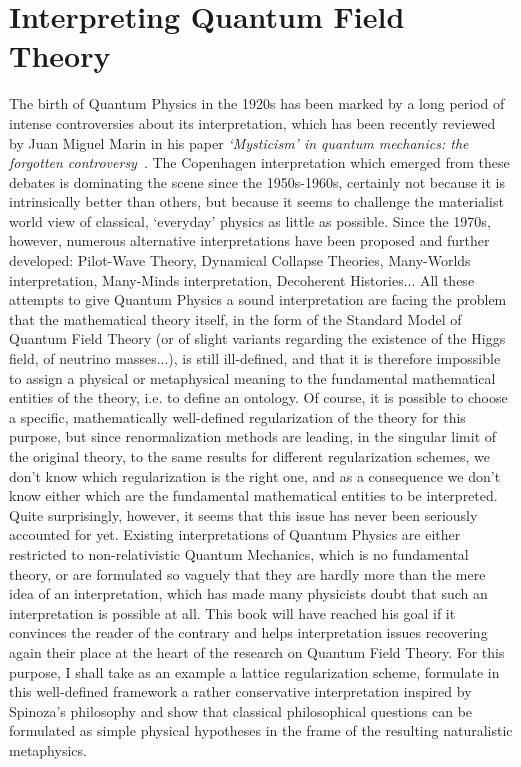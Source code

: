 \documentclass[10pt,a4paper,twoside,openany]{book}
\begin{document}
\section*{Interpreting Quantum Field Theory}

The birth of Quantum Physics in the 1920s has been marked by a long period of intense controversies about its interpretation, which has been recently reviewed by Juan Miguel Marin in his paper \textit{‘Mysticism’ in quantum mechanics: the forgotten controversy}~\cite{Marin2009}. The Copenhagen interpretation which emerged from these debates is dominating the scene since the 1950s-1960s, certainly not because it is intrinsically better than others, but because it seems to challenge the materialist world view of classical, `everyday' physics as little as possible. Since the 1970s, however, numerous alternative interpretations have been proposed and further developed: Pilot-Wave Theory, Dynamical Collapse Theories, Many-Worlds interpretation, Many-Minds interpretation, Decoherent Histories... All these attempts to give Quantum Physics a sound interpretation are facing the problem that the mathematical theory itself, in the form of the Standard Model of Quantum Field Theory (or of slight variants regarding the existence of the Higgs field, of neutrino masses...), is still ill-defined, and that it is therefore impossible to assign a physical or metaphysical meaning to the fundamental mathematical entities of the theory, i.e. to define an ontology. Of course, it is possible to choose a specific, mathematically well-defined regularization of the theory for this purpose, but since renormalization methods are leading, in the singular limit of the original theory, to the same results for different regularization schemes, we don't know which regularization is the right one, and as a consequence we don't know either which are the fundamental mathematical entities to be interpreted. Quite surprisingly, however, it seems that this issue has never been seriously accounted for yet. Existing interpretations of Quantum Physics are either restricted to non-relativistic Quantum Mechanics, which is no fundamental theory, or are formulated so vaguely that they are hardly more than the mere idea of an interpretation, which has made many physicists doubt that such an interpretation is possible at all. This book will have reached his goal if it convinces the reader of the contrary and helps interpretation issues recovering again their place at the heart of the research on Quantum Field Theory. For this purpose, I shall take as an example a lattice regularization scheme, formulate in this well-defined framework a rather conservative interpretation inspired by Spinoza's philosophy and show that classical philosophical questions can be formulated as simple physical hypotheses in the frame of the resulting naturalistic metaphysics.
\end{document}
